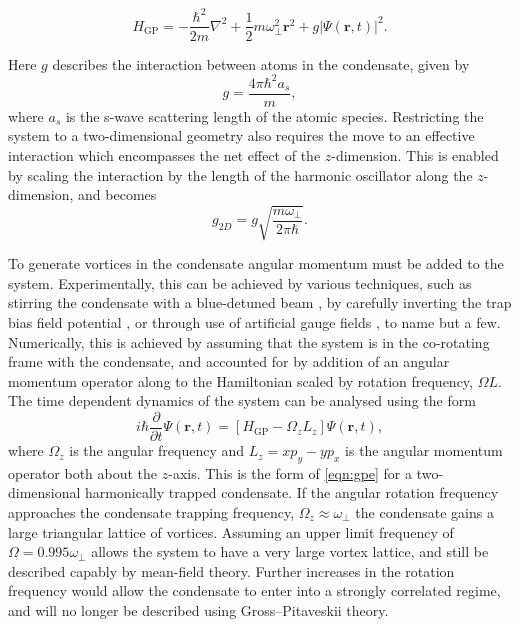 \begin{equation}\label{eqn:gpe_h0}
	H_{\mathrm{GP}} = -\frac{\hbar^2}{2m}\nabla^2 + \frac{1}{2}m\omega_{\perp}^2\mathbf{r}^2 + g\vert\Psi(\mathbf{r},t)\vert^2.
\end{equation}

Here $g$ describes the interaction between atoms in the condensate, given by \begin{equation}
g = \frac{4\pi\hbar^2a_s}{m},
\end{equation}
where $a_s$ is the s-wave scattering length of the atomic species. Restricting the system to a two-dimensional geometry also requires the move to an effective interaction which encompasses the net effect of the $z$-dimension. This is enabled by scaling the interaction by the length of the harmonic oscillator along the $z$-dimension, and becomes
\begin{equation}
g_{2D} = g\sqrt{\frac{m\omega_\perp}{2\pi\hbar}}.
\end{equation}

To generate vortices in the condensate angular momentum must be added to the system. Experimentally, this can be achieved by various techniques, such as stirring the condensate with a blue-detuned beam \cite{Vtx:Raman_prl_2001}, by carefully inverting the trap bias field potential \cite{Vtx:Kawaguchi_pra_2004}, or through use of artificial gauge fields \cite{AO:Dalibard_rmp_2011}, to name but a few. Numerically, this is achieved by assuming that the system is in the co-rotating frame with the condensate, and accounted for by addition of an angular momentum operator along to the Hamiltonian scaled by rotation frequency, $\Omega L$. The time dependent dynamics of the system can be analysed using the form
\begin{equation}\label{eqn:gpe2d}
	i\hbar\frac{\partial}{\partial t}\Psi(\mathbf{r},t) = \left[ H_{\text{GP}}  -  \Omega_z L_z \right] \Psi(\mathbf{r},t),
\end{equation}
where $\Omega_z$ is the angular frequency and $L_z = xp_y - yp_x$ is the angular momentum operator both about the $z$-axis. This is the form of \ref{eqn:gpe} for a two-dimensional harmonically trapped condensate. If the angular rotation frequency approaches the condensate trapping frequency, $\Omega_z \approx \omega_\perp$ the condensate gains a large triangular lattice of vortices. Assuming an upper limit frequency of $\Omega = 0.995\omega_\perp$ allows the system to have a very large vortex lattice, and still be described capably by mean-field theory. Further increases in the rotation frequency would allow the condensate to enter into a strongly correlated regime, and will no longer be described using Gross--Pitaveskii theory.

